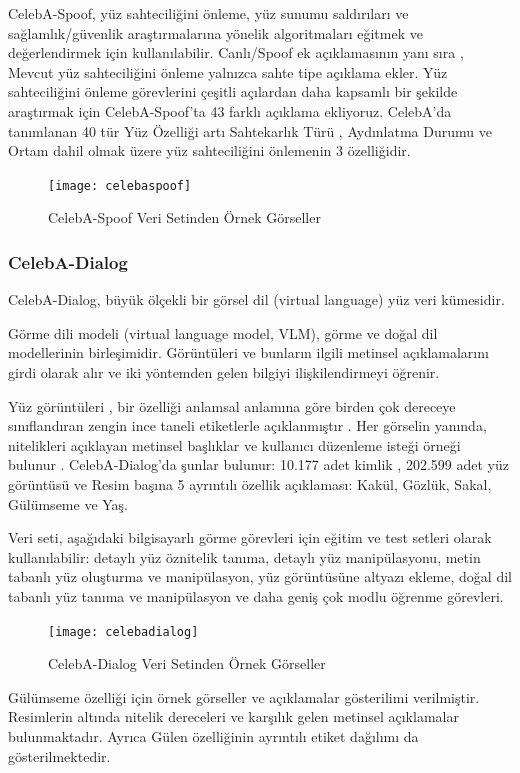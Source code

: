 \documentclass[12pt, a4paper]{article}
\begin{document}
	CelebA-Spoof, yüz sahteciliğini önleme, yüz sunumu saldırıları ve sağlamlık/güvenlik araştırmalarına yönelik algoritmaları eğitmek ve değerlendirmek için kullanılabilir.
	Canlı/Spoof ek açıklamasının yanı sıra , Mevcut yüz sahteciliğini önleme yalnızca sahte tipe açıklama ekler. Yüz sahteciliğini önleme görevlerini çeşitli açılardan daha kapsamlı bir şekilde araştırmak için CelebA-Spoof'ta 43 farklı açıklama ekliyoruz. CelebA'da tanımlanan 40 tür Yüz Özelliği artı Sahtekarlık Türü , Aydınlatma Durumu ve Ortam dahil olmak üzere yüz sahteciliğini önlemenin 3 özelliğidir.
	
	\begin{figure}[h]
		\centering
		\texttt{[image: celebaspoof]}
		\label{celebaspoof}
		\caption{ CelebA-Spoof Veri Setinden Örnek Görseller\cite{CelebA-2024-04-04}}
	\end{figure}
		\FloatBarrier
	\subsubsection{CelebA-Dialog}
	CelebA-Dialog, büyük ölçekli bir görsel dil (virtual language) yüz veri kümesidir.
	
	Görme dili modeli (virtual language model, VLM), görme ve doğal dil modellerinin birleşimidir. Görüntüleri ve bunların ilgili metinsel açıklamalarını girdi olarak alır ve iki yöntemden gelen bilgiyi ilişkilendirmeyi öğrenir.
	
	Yüz görüntüleri , bir özelliği anlamsal anlamına göre birden çok dereceye sınıflandıran zengin ince taneli etiketlerle açıklanmıştır . Her görselin yanında, nitelikleri açıklayan metinsel başlıklar ve kullanıcı düzenleme isteği örneği bulunur .
	CelebA-Dialog'da şunlar bulunur:
	10.177 adet kimlik ,
	202.599 adet yüz görüntüsü ve
	Resim başına 5 ayrıntılı özellik açıklaması: Kakül, Gözlük, Sakal, Gülümseme ve Yaş.
	
	Veri seti, aşağıdaki bilgisayarlı görme görevleri için eğitim ve test setleri olarak kullanılabilir: detaylı yüz öznitelik tanıma, detaylı yüz manipülasyonu, metin tabanlı yüz oluşturma ve manipülasyon, yüz görüntüsüne altyazı ekleme, doğal dil tabanlı yüz tanıma ve manipülasyon ve daha geniş çok modlu öğrenme görevleri.
	
	\begin{figure}[h]
		\centering
		\texttt{[image: celebadialog]}
		\label{celebadialog}
		\caption{CelebA-Dialog Veri Setinden Örnek Görseller\cite{CelebA-2024-04-04}}
	\end{figure}
		\FloatBarrier
	Gülümseme özelliği için örnek görseller ve açıklamalar gösterilimi verilmiştir. Resimlerin altında nitelik dereceleri ve karşılık gelen metinsel açıklamalar bulunmaktadır. Ayrıca Gülen özelliğinin ayrıntılı etiket dağılımı da gösterilmektedir\cite{zhang2020celeba}.
	\clearpage
	
\end{document}
